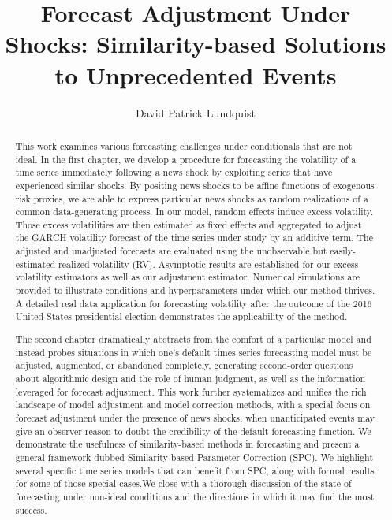 \documentclass{uiucthesis2021}
\theoremstyle{definition}
\begin{document}
\title{Forecast Adjustment Under Shocks: Similarity-based Solutions to Unprecedented Events}
\author{David Patrick Lundquist}
\phdthesis
{}
\maketitle


\frontmatter

\begin{abstract}
    This work examines various forecasting challenges under conditionals that are not ideal.  In the first chapter, we develop a procedure for forecasting the volatility of a time series immediately following a news shock by exploiting  series that have experienced similar shocks.  By positing news shocks to be affine functions of exogenous risk proxies, we are able to express particular news shocks as random realizations of a common data-generating process.  In our model, random effects induce excess volatility.  Those excess volatilities are then estimated as fixed effects and aggregated to adjust the GARCH volatility forecast of the time series under study by an additive term.  The adjusted and unadjusted forecasts are evaluated using the unobservable but easily-estimated realized volatility (RV).  Asymptotic results are established for our excess volatility estimators as well as our adjustment estimator.  Numerical simulations are provided to illustrate conditions and hyperparameters under which our method thrives. A detailed real data application for forecasting volatility after the outcome of the 2016 United States presidential election demonstrates the applicability of the method.

    The second chapter dramatically abstracts from the comfort of a particular model and instead probes situations in which one's default times series forecasting model must be adjusted, augmented, or abandoned completely, generating second-order questions about algorithmic design and the role of human judgment, as well as the information leveraged for forecast adjustment.  This work further systematizes and unifies the rich landscape of model adjustment and model correction methods, with a special focus on forecast adjustment under the presence of news shocks, when unanticipated events may give an observer reason to doubt the credibility of the default forecasting function.  We demonstrate the usefulness of similarity-based methods in forecasting and present a general framework dubbed Similarity-based Parameter Correction (SPC).  We highlight several specific time series models that can benefit from SPC, along with formal results for some of those special cases.We close with a thorough discussion of the state of forecasting under non-ideal conditions and the directions in which it may find the most success.
\end{abstract}
\end{document}
